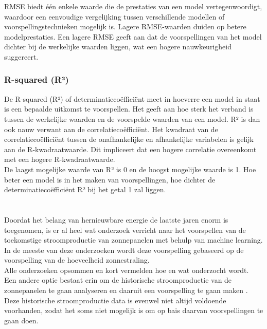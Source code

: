 RMSE biedt één enkele waarde die de prestaties van een model vertegenwoordigt, waardoor een eenvoudige vergelijking tussen verschillende modellen of voorspellingstechnieken mogelijk is. Lagere RMSE-waarden duiden op betere modelprestaties. Een lagere RMSE geeft aan dat de voorspellingen van het model dichter bij de werkelijke waarden liggen, wat een hogere nauwkeurigheid suggereert.

\subsubsection{R-squared (R²)}

De R-squared (R²) of determinatiecoëfficiënt meet in hoeverre een model in staat is een bepaalde uitkomst te voorspellen. Het geeft aan hoe sterk het verband is tussen de werkelijke waarden en de voorspelde waarden van een model. R² is dan ook nauw verwant aan de correlatiecoëfficiënt. Het kwadraat van de correlatiecoëfficiënt tussen de onafhankelijke en afhankelijke variabelen is gelijk aan de R-kwadraatwaarde. Dit impliceert dat een hogere correlatie overeenkomt met een hogere R-kwadraatwaarde. \\

De laagst mogelijke waarde van R² is 0 en de hoogst mogelijke waarde is 1. Hoe beter een model is in het maken van voorspellingen, hoe dichter de determinatiecoëfficiënt R² bij het getal 1 zal liggen.

\section{}%
\label{sec:elektriciteitsproductie voorspellen}

Doordat het belang van hernieuwbare energie de laatste jaren enorm is toegenomen, is er al heel wat onderzoek verricht naar het voorspellen van de toekomstige stroomproductie van zonnepanelen met behulp van machine learning. In de meeste van deze onderzoeken wordt deze voorspelling gebaseerd op de voorspelling van de hoeveelheid zonnestraling. \\

Alle onderzoeken opsommen en kort vermelden hoe en wat onderzocht wordt. \\

Een andere optie bestaat erin om de historische stroomproductie van de zonnepanelen te gaan analyseren en daaruit een voorspelling te gaan maken \autocite{Wang2022}. Deze historische stroomproductie data is evenwel niet altijd voldoende voorhanden, zodat het soms niet mogelijk is om op bais daarvan voorspellingen te gaan doen.


